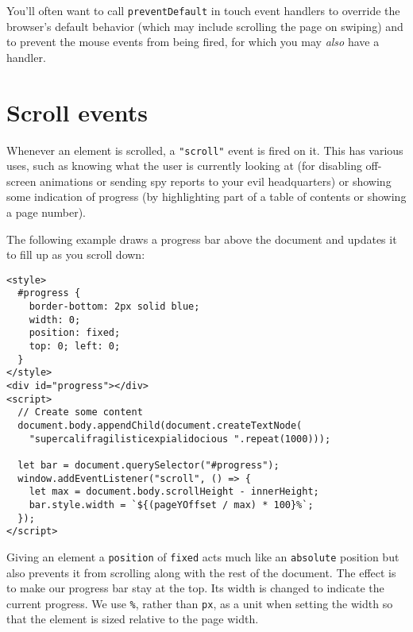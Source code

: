 You'll often want to call \lstinline`preventDefault` in touch event handlers to override the browser's default behavior (which may include scrolling the page on swiping) and to prevent the mouse events from being fired, for which you may \emph{also} have a handler.

\section{Scroll events}

Whenever an element is scrolled, a \lstinline`"scroll"` event is fired on it. This has various uses, such as knowing what the user is currently looking at (for disabling off-screen animations or sending spy reports to your evil headquarters) or showing some indication of progress (by highlighting part of a table of contents or showing a page number).

The following example draws a progress bar above the document and updates it to fill up as you scroll down:

\begin{lstlisting}
<style>
  #progress {
    border-bottom: 2px solid blue;
    width: 0;
    position: fixed;
    top: 0; left: 0;
  }
</style>
<div id="progress"></div>
<script>
  // Create some content
  document.body.appendChild(document.createTextNode(
    "supercalifragilisticexpialidocious ".repeat(1000)));

  let bar = document.querySelector("#progress");
  window.addEventListener("scroll", () => {
    let max = document.body.scrollHeight - innerHeight;
    bar.style.width = `${(pageYOffset / max) * 100}%`;
  });
</script>
\end{lstlisting}
\noindent{}

Giving an element a \lstinline`position` of \lstinline`fixed` acts much like an \lstinline`absolute` position but also prevents it from scrolling along with the rest of the document. The effect is to make our progress bar stay at the top. Its width is changed to indicate the current progress. We use \lstinline`%`, rather than \lstinline`px`, as a unit when setting the width so that the element is sized relative to the page width.

